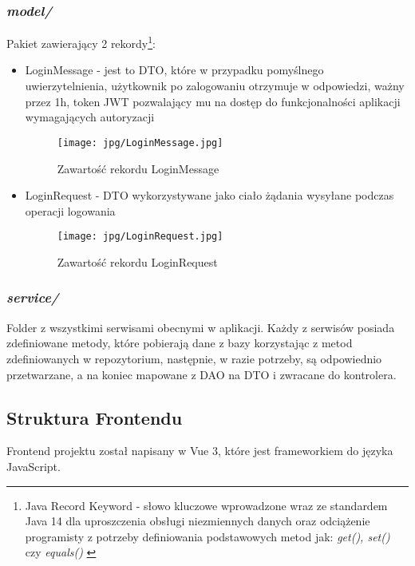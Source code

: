 \documentclass[11pt,a4paper]{article}
\begin{document}
\subsubsection{\textsl{model/}}
Pakiet zawierający 2 rekordy\footnote{Java Record Keyword - słowo kluczowe wprowadzone wraz ze standardem Java 14 dla uproszczenia obsługi niezmiennych danych oraz odciążenie programisty z potrzeby definiowania podstawowych metod jak: \textsl{get(), set()} czy \textsl{equals()} \cite{java-record-keyword}}:
\begin{itemize}
    \item LoginMessage - jest to DTO, które w przypadku pomyślnego uwierzytelnienia, użytkownik po zalogowaniu otrzymuje w odpowiedzi, ważny przez 1h, token JWT pozwalający mu na dostęp do funkcjonalności aplikacji wymagających autoryzacji
    
    \begin{figure}[H]
    \centering
    \texttt{[image: jpg/LoginMessage.jpg]}
    \caption{Zawartość rekordu LoginMessage}
    \end{figure}
    
    \item LoginRequest - DTO wykorzystywane jako ciało żądania wysyłane podczas operacji logowania

    \begin{figure}[H]
    \centering
    \texttt{[image: jpg/LoginRequest.jpg]}
    \caption{Zawartość rekordu LoginRequest}
    \end{figure}
\end{itemize}

\subsubsection{\textsl{service/}}
Folder z wszystkimi serwisami obecnymi w aplikacji. Każdy z serwisów posiada zdefiniowane metody, które pobierają dane z bazy korzystając z metod zdefiniowanych w repozytorium, następnie, w razie potrzeby, są odpowiednio przetwarzane, a na koniec mapowane z DAO na DTO i zwracane do kontrolera.

\subsection{Struktura Frontendu}

Frontend projektu został napisany w Vue 3, które jest frameworkiem do języka JavaScript.\\
\end{document}
